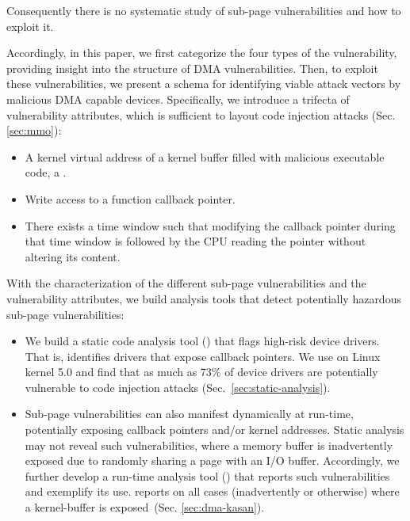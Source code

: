 Consequently there is no systematic study of sub-page vulnerabilities and how to exploit it.

Accordingly, in this paper, we first categorize the four types of the \subpage{} vulnerability, providing insight into the structure of DMA vulnerabilities.
Then, to exploit these vulnerabilities, we present a schema for identifying viable attack vectors by malicious DMA capable devices. Specifically, we introduce a trifecta of vulnerability attributes, which is sufficient to layout code injection attacks (Sec. \ref{sec:mmo}):

\begin{itemize}
    \item A kernel virtual address of a kernel buffer filled with malicious executable code, a \mabaf.
    \item Write access to a function callback pointer.
    \item There exists a time window such that modifying the callback pointer during that time window is followed by the CPU reading the pointer without altering its content. 
\end{itemize} 



With the characterization of the different sub-page vulnerabilities and the vulnerability attributes, we build analysis tools that detect potentially hazardous sub-page vulnerabilities:

\begin{itemize}
    \item We build a static code analysis tool (\tool) that flags high-risk device drivers. That is, \tool identifies drivers that expose callback pointers.
We use \tool on Linux kernel 5.0 and find that as much as 73\% of device drivers are potentially vulnerable to code injection attacks (Sec.~\ref{sec:static-analysis}). 

    \item Sub-page vulnerabilities can also manifest dynamically at run-time, potentially exposing callback pointers and/or kernel addresses. 
Static analysis may not reveal such vulnerabilities, where a memory buffer is inadvertently exposed due to randomly sharing a page with an I/O buffer. Accordingly, we further develop a run-time analysis tool (\dkasan) that reports such vulnerabilities and exemplify its use. \dkasan reports on all cases (inadvertently or otherwise) where a kernel-buffer is exposed~(Sec. \ref{sec:dma-kasan}).
\end{itemize}


